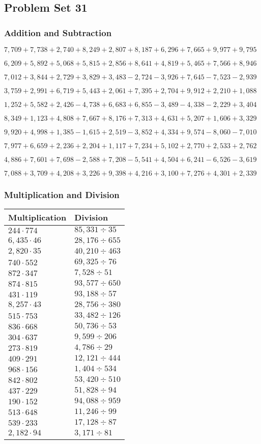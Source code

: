 \hypertarget{problem-set-31-3}{%
\subsection{Problem Set 31}\label{problem-set-31-3}}

\hypertarget{addition-and-subtraction-193}{%
\subsubsection{Addition and
Subtraction}\label{addition-and-subtraction-193}}

\(7,709+7,738+2,740+8,249+2,807+8,187+6,296+7,665+9,977+ 9,795\)

\(6,209+5,892+5,068+5,815+2,856+8,641+4,819+5,465+7,566+8,946\)

\(7,012+3,844+2,729+3,829+3,483-2,724-3,926+7,645-7,523-2,939\)

\(3,759+2,991+6,719+5,443+2,061+7,395+2,704+9,912+2,210+1,088\)

\(1,252+5,582+2,426-4,738+6,683+6,855-3,489-4,338-2,229+3,404\)

\(8,349+1,123+4,808+7,667+8,176+7,313+4,631+5,207+1,606+3,329\)

\(9,920+4,998+1,385-1,615+2,519-3,852+4,334+9,574-8,060-7,010\)

\(7,977+6,659+2,236+2,204+1,117+7,234+5,102+2,770+2,533+2,762\)

\(4,886+7,601+7,698-2,588+7,208-5,541+4,504+6,241-6,526-3,619\)

\(7,088+3,709+4,208+3,226+9,398+4,216+3,100+7,276+4,301+2,339\)

\hypertarget{multiplication-and-division-192}{%
\subsubsection{Multiplication and
Division}\label{multiplication-and-division-192}}

\begin{longtable}[]{@{}ll@{}}
\toprule
Multiplication & Division\tabularnewline
\midrule
\endhead
\(244\cdot774\) & \(85,331÷35\)\tabularnewline
\(6,435\cdot46\) & \(28,176÷655\)\tabularnewline
\(2,820\cdot35\) & \(40,210÷463\)\tabularnewline
\(740\cdot552\) & \(69,325÷76\)\tabularnewline
\(872\cdot347\) & \(7,528÷51\)\tabularnewline
\(874\cdot815\) & \(93,577÷650\)\tabularnewline
\(431\cdot119\) & \(93,188÷57\)\tabularnewline
\(8,257\cdot43\) & \(28,756÷380\)\tabularnewline
\(515\cdot753\) & \(33,482÷126\)\tabularnewline
\(836\cdot668\) & \(50,736÷53\)\tabularnewline
\(304\cdot637\) & \(9,599÷206\)\tabularnewline
\(273\cdot819\) & \(4,786÷29\)\tabularnewline
\(409\cdot291\) & \(12,121÷444\)\tabularnewline
\(968\cdot156\) & \(1,404÷534\)\tabularnewline
\(842\cdot802\) & \(53,420÷510\)\tabularnewline
\(437\cdot229\) & \(51,828÷94\)\tabularnewline
\(190\cdot152\) & \(94,088÷959\)\tabularnewline
\(513\cdot648\) & \(11,246÷99\)\tabularnewline
\(539\cdot233\) & \(17,128÷87\)\tabularnewline
\(2,182\cdot94\) & \(3,171÷81\)\tabularnewline
\bottomrule
\end{longtable}


